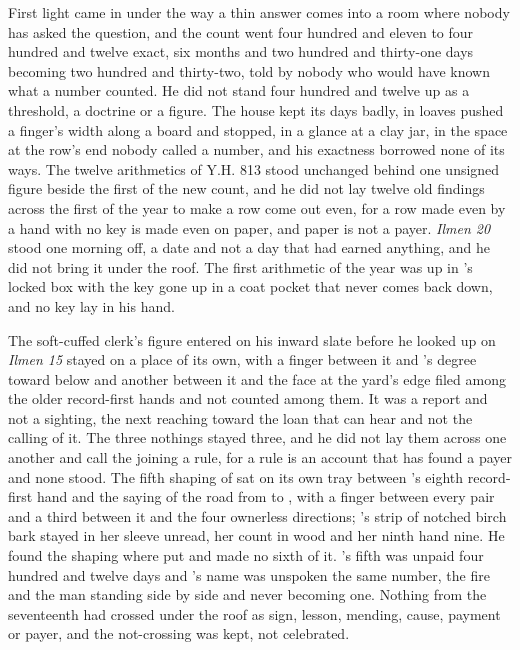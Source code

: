 First light came in under  the way a thin answer comes into a room where nobody has asked the question, and the count went four hundred and eleven to four hundred and twelve exact, six months and two hundred and thirty-one days becoming two hundred and thirty-two, told by nobody who would have known what a number counted. He did not stand four hundred and twelve up as a threshold, a doctrine or a figure. The house kept its days badly, in loaves pushed a finger's width along a board and stopped, in a glance at a clay jar, in the space at the row's end nobody called a number, and his exactness borrowed none of its ways. The twelve arithmetics of Y.H. 813 stood unchanged behind one unsigned figure beside the first of the new count, and he did not lay twelve old findings across the first of the year to make a row come out even, for a row made even by a hand with no key is made even on paper, and paper is not a payer. \emph{Ilmen 20} stood one morning off, a date and not a day that had earned anything, and he did not bring it under the roof. The first arithmetic of the year was up  in 's locked box with the key gone up in a coat pocket that never comes back down, and no key lay in his hand.

The soft-cuffed clerk's figure entered on his inward slate before he looked up on \emph{Ilmen 15} stayed on a place of its own, with a finger between it and 's degree toward  below  and another between it and the face at the yard's edge filed among the older record-first hands and not counted among them. It was a report and not a sighting, the next reaching toward the loan that can hear and not the calling of it. The three nothings stayed three, and he did not lay them across one another and call the joining a rule, for a rule is an account that has found a payer and none stood. The fifth shaping of  sat on its own tray between 's eighth record-first hand and the saying of the road from  to , with a finger between every pair and a third between it and the four ownerless directions; 's strip of notched birch bark stayed in her sleeve unread, her count in wood and her ninth hand nine. He found the shaping where put and made no sixth of it. 's fifth was unpaid four hundred and twelve days and 's name was unspoken the same number, the fire and the man standing side by side and never becoming one. Nothing from the seventeenth had crossed under the roof as sign, lesson, mending, cause, payment or payer, and the not-crossing was kept, not celebrated.

